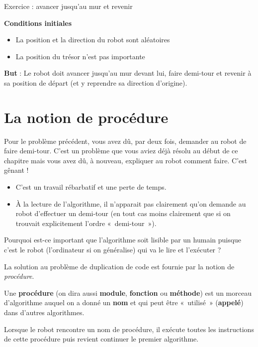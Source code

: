 	\begin{Emphase}{Exercice : avancer jusqu'au mur et revenir}

		\textbf{Conditions initiales}

		\begin{itemize}
		\item La position et la direction du robot sont aléatoires
		\item La position du trésor n'est pas importante
		\end{itemize}
		
		\textbf{But} : Le robot doit avancer jusqu'au mur
		devant lui, faire demi-tour et revenir à sa position de départ 
		(et y reprendre sa direction d'origine).

	\end{Emphase}

\section{La notion de procédure}

	Pour le problème précédent, vous avez dû, par deux fois, demander au
	robot de faire demi-tour. C'est un problème que vous
	aviez déjà résolu au début de ce chapitre mais vous avez dû, à nouveau,
	expliquer au robot comment faire. C'est gênant !

	\begin{itemize}
	\item C'est un travail rébarbatif et une perte de temps.
	\item 
		À la lecture de l'algorithme, 
		il n'apparait pas clairement qu'on demande au robot 
		d'effectuer un demi-tour
		(en tout cas moins clairement que si on trouvait explicitement
		l'ordre «~demi-tour~»).
	\end{itemize}

	Pourquoi est-ce important que l'algorithme soit lisible
	par un humain puisque c'est le robot
	(l'ordinateur si on généralise) qui va le lire et
	l'exécuter ?

	La solution au problème de duplication de code est fournie par la notion
	de \textit{procédure}.

	Une \textbf{procédure} (on dira aussi \textbf{module}, \textbf{fonction}
	ou \textbf{méthode}) est un morceau d'algorithme
	auquel on a donné un \textbf{nom} et qui peut être «~utilisé~»
	(\textbf{appelé}) dans d'autres algorithmes.

	Lorsque le robot rencontre un nom de procédure, il exécute toutes les
	instructions de cette procédure puis revient continuer le premier
	algorithme.

